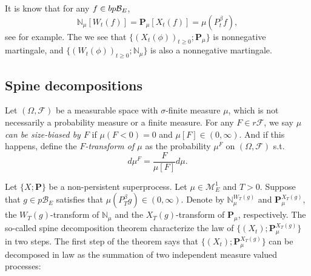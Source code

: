 \documentclass[12pt, a4paper]{amsart}
\theoremstyle{definition}
\numberwithin{equation}{section}
\begin{document}
It is know that for any $f\in bp{\cal B}_E$,
\[\label{mean-N}
\mathbb N_{\mu}[W_t(f)]=\mathbf P_{\mu}[X_t(f)]=\mu(P^\beta_tf),
\]
see \cite[Lemma 3.3]{RenSongSun2017Spine} for example. The we see that $\{(X_t(\phi))_{t\geq 0};\mathbf P_{\mu}\}$ is nonnegative martingale,  and $\{(W_t(\phi))_{t\geq 0};\mathbb N_{\mu}\}$ is also a nonnegative martingale.

\subsection{Spine decompositions}
\label{sec: Spine decompositions}
	Let $(\Omega, \mathscr F)$ be a measurable space with $\sigma$-finite measure $\mu$, which is not necessarily a probability measure or a finite measure.
	For any $F\in r\mathscr F$, we say \emph{$\mu$ can be size-biased by $F$} if $\mu(F< 0) = 0$ and 
	$\mu [F] \in (0,\infty)$.
	And if this happens, define the \emph{$F$-transform of $\mu$} as the probability $\mu^F$ on $(\Omega, \mathscr F)$ s.t. 
	$$d\mu^F= \frac{F}{\mu[F]}d \mu.$$

	Let $\{X;\mathbf P\}$ be a non-persistent superprocess.
	Let $\mu \in \mathcal M^1_E$ and $T>0$.
	Suppose that $g\in p\mathscr B_E$ satisfies that $\mu(P^\beta_Tg) \in (0,\infty)$.
	Denote by $\mathbb N^{W_T(g)}_\mu$ and $\mathbf P_\mu^{X_T(g)}$, the $W_T(g)$-transform of $\mathbb N_\mu$ and the $X_T(g)$-transform of $\mathbf P_\mu$, respectively.
	The so-called spine decomposition theorem characterize the law of $\{(X_t); \mathbf P_\mu^{X_T(g)}\}$ in two steps.
	The first step of the theorem says that $\{(X_t); \mathbf P_\mu^{X_T(g)}\}$ can be decomposed in law as the summation of two independent measure valued processes:
	
\end{document}
